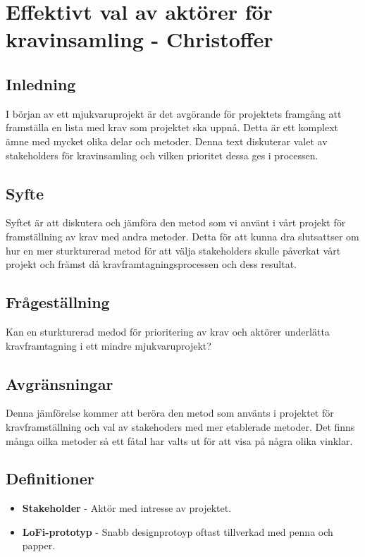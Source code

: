 \chapter{Effektivt val av aktörer för \\kravinsamling - Christoffer}

\section{Inledning}
I början av ett mjukvaruprojekt är det avgörande för projektets framgång att framställa en lista med krav som projektet ska uppnå. Detta är ett komplext ämne med mycket olika delar och metoder. Denna text diskuterar valet av stakeholders för kravinsamling och vilken prioritet dessa ges i processen.

\section{Syfte}
Syftet är att diskutera och jämföra den metod som vi använt i vårt projekt för framställning av krav med andra metoder. Detta för att kunna dra slutsattser om hur en mer sturkturerad metod för att välja stakeholders skulle påverkat vårt projekt och främst då kravframtagningsprocessen och dess resultat.

\section{Frågeställning}
Kan en sturkturerad medod för prioritering av krav och aktörer underlätta kravframtagning i ett mindre mjukvaruprojekt?

\section{Avgränsningar}
Denna jämförelse kommer att beröra den metod som använts i projektet för kravframställning och val av stakehoders med mer etablerade metoder. Det finns många oilka metoder så ett fåtal har valts ut för att visa på några olika vinklar. 

\section{Definitioner}
\begin{itemize}
	\item \textbf{Stakeholder} - Aktör med intresse av projektet.
	\item \textbf{LoFi-prototyp} - Snabb designprotoyp oftast tillverkad med penna och papper.
\end{itemize}


